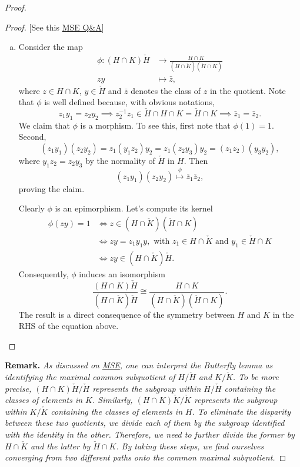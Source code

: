 \begin{proof}
\begin{proof} {[See this \href{https://math.stackexchange.com/q/3857104/269050}{MSE Q\&A}]}
\begin{enumerate}[a),font=\upshape]
    \item Consider the map
    \begin{align*}
        \phi\colon(H\cap K)\check H&\to\frac{H\cap K}{(H\cap\check K)(\check H\cap K)}\\
        zy&\mapsto\bar z,
    \end{align*}
    where $z\in H\cap K$, $y\in\check H$ and $\bar z$ denotes the class of $z$ in the quotient. Note that $\phi$ is well defined because, with obvious notations, 
    $$
        z_1y_1=z_2y_2
            \implies z_2^{-1}z_1\in \check H\cap H\cap K
                =\check H\cap K
            \implies\bar z_1=\bar z_2.
    $$
    We claim that $\phi$ is a morphism. To see this, first note that $\phi(1)=1$. Second,
    $$
        (z_1y_1)(z_2y_2)=z_1(y_1z_2)y_2=z_1(z_2y_3)y_2=(z_1z_2)(y_3y_2),
    $$
    where $y_1z_2=z_2y_3$ by the normality of $\check H$ in $H$. Then
    $$
        (z_1y_1)(z_2y_2)\stackrel{\phi}{\mapsto}\bar z_1\bar z_2,
    $$
    proving the claim.

    Clearly $\phi$ is an epimorphism. Let's compute its kernel
    \begin{align*}
        \phi(zy) = 1 &\iff z\in (H\cap\check K)(\check H\cap K)\\
            &\iff zy=z_1y_1y,
                \text{ with }z_1\in H\cap\check K
                \text{ and }y_1\in\check H\cap K\\
            &\iff zy\in(H\cap\check K)\check H.
    \end{align*}
    Consequently, $\phi$ induces an isomorphism
    $$
         \frac{(H\cap K){\check H}}{(H\cap {\check K}){\check H}}
            \cong \frac{H\cap K}{(H\cap\check K)(\check H\cap K)}.
    $$
    The result is a direct consequence of the symmetry between $H$ and $K$ in the RHS of the equation above.
\end{enumerate}
\end{proof}

\medskip

\textbf{Remark.} {\itshape As discussed on \href{https://math.stackexchange.com/a/4450392/269050}{MSE}, one can interpret the\/ {\upshape Butterfly lemma} as identifying the maximal common subquotient of\/ $H/\check{H}$ and\/ $K/\check{K}$. To be more precise, $(H \cap K)\check{H}/\check{H}$ represents the subgroup within\/ $H/\check{H}$ containing the classes of elements in\/ $K$. Similarly, $(H \cap K)\check{K}/\check{K}$ represents the subgroup within\/ $K/\check{K}$ containing the classes of elements in\/ $H$. To eliminate the disparity between these two quotients, we divide each of them by the subgroup identified with the identity in the other. Therefore, we need to further divide the former by\/ $H \cap \check{K}$ and the latter by $\check{H} \cap K$. By taking these steps, we find ourselves converging from two different paths onto the common maximal subquotient.}


\end{proof}
